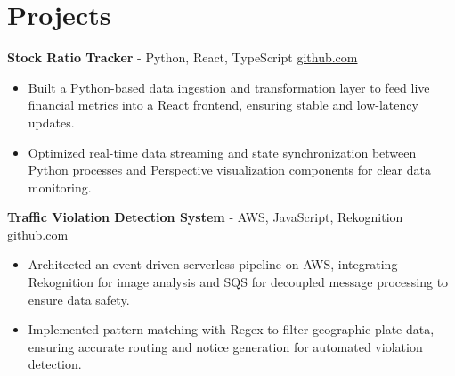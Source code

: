 \documentclass[11pt]{article}       %
\begin{document}

\vspace{-18.5pt}

\section*{Projects}

\textbf{Stock Ratio Tracker}{ - Python, React, TypeScript} \hfill \href{https://github.com/Monica20030707/Trading-Dashboard_UI}{github.com} \\
\vspace{-9pt}
\begin{itemize}
  \item Built a Python-based data ingestion and transformation layer to feed live financial metrics into a React frontend, ensuring stable and low-latency updates.
  \item Optimized real-time data streaming and state synchronization between Python processes and Perspective visualization components for clear data monitoring.
\end{itemize}

\textbf{Traffic Violation Detection System}{ - AWS, JavaScript, Rekognition} \hfill \href{https://github.com/Monica20030707/AWS_rekonigition-N-read-database}{github.com} \\
\vspace{-9pt}
\begin{itemize}
  \item Architected an event-driven serverless pipeline on AWS, integrating Rekognition for image analysis and SQS for decoupled message processing to ensure data safety.
  \item Implemented pattern matching with Regex to filter geographic plate data, ensuring accurate routing and notice generation for automated violation detection.
\end{itemize}
\end{document}
